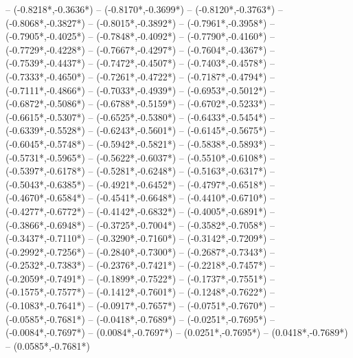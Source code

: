 {	-- ({-0.8218*\dx},{-0.3636*\dy})
	-- ({-0.8170*\dx},{-0.3699*\dy})
	-- ({-0.8120*\dx},{-0.3763*\dy})
	-- ({-0.8068*\dx},{-0.3827*\dy})
	-- ({-0.8015*\dx},{-0.3892*\dy})
	-- ({-0.7961*\dx},{-0.3958*\dy})
	-- ({-0.7905*\dx},{-0.4025*\dy})
	-- ({-0.7848*\dx},{-0.4092*\dy})
	-- ({-0.7790*\dx},{-0.4160*\dy})
	-- ({-0.7729*\dx},{-0.4228*\dy})
	-- ({-0.7667*\dx},{-0.4297*\dy})
	-- ({-0.7604*\dx},{-0.4367*\dy})
	-- ({-0.7539*\dx},{-0.4437*\dy})
	-- ({-0.7472*\dx},{-0.4507*\dy})
	-- ({-0.7403*\dx},{-0.4578*\dy})
	-- ({-0.7333*\dx},{-0.4650*\dy})
	-- ({-0.7261*\dx},{-0.4722*\dy})
	-- ({-0.7187*\dx},{-0.4794*\dy})
	-- ({-0.7111*\dx},{-0.4866*\dy})
	-- ({-0.7033*\dx},{-0.4939*\dy})
	-- ({-0.6953*\dx},{-0.5012*\dy})
	-- ({-0.6872*\dx},{-0.5086*\dy})
	-- ({-0.6788*\dx},{-0.5159*\dy})
	-- ({-0.6702*\dx},{-0.5233*\dy})
	-- ({-0.6615*\dx},{-0.5307*\dy})
	-- ({-0.6525*\dx},{-0.5380*\dy})
	-- ({-0.6433*\dx},{-0.5454*\dy})
	-- ({-0.6339*\dx},{-0.5528*\dy})
	-- ({-0.6243*\dx},{-0.5601*\dy})
	-- ({-0.6145*\dx},{-0.5675*\dy})
	-- ({-0.6045*\dx},{-0.5748*\dy})
	-- ({-0.5942*\dx},{-0.5821*\dy})
	-- ({-0.5838*\dx},{-0.5893*\dy})
	-- ({-0.5731*\dx},{-0.5965*\dy})
	-- ({-0.5622*\dx},{-0.6037*\dy})
	-- ({-0.5510*\dx},{-0.6108*\dy})
	-- ({-0.5397*\dx},{-0.6178*\dy})
	-- ({-0.5281*\dx},{-0.6248*\dy})
	-- ({-0.5163*\dx},{-0.6317*\dy})
	-- ({-0.5043*\dx},{-0.6385*\dy})
	-- ({-0.4921*\dx},{-0.6452*\dy})
	-- ({-0.4797*\dx},{-0.6518*\dy})
	-- ({-0.4670*\dx},{-0.6584*\dy})
	-- ({-0.4541*\dx},{-0.6648*\dy})
	-- ({-0.4410*\dx},{-0.6710*\dy})
	-- ({-0.4277*\dx},{-0.6772*\dy})
	-- ({-0.4142*\dx},{-0.6832*\dy})
	-- ({-0.4005*\dx},{-0.6891*\dy})
	-- ({-0.3866*\dx},{-0.6948*\dy})
	-- ({-0.3725*\dx},{-0.7004*\dy})
	-- ({-0.3582*\dx},{-0.7058*\dy})
	-- ({-0.3437*\dx},{-0.7110*\dy})
	-- ({-0.3290*\dx},{-0.7160*\dy})
	-- ({-0.3142*\dx},{-0.7209*\dy})
	-- ({-0.2992*\dx},{-0.7256*\dy})
	-- ({-0.2840*\dx},{-0.7300*\dy})
	-- ({-0.2687*\dx},{-0.7343*\dy})
	-- ({-0.2532*\dx},{-0.7383*\dy})
	-- ({-0.2376*\dx},{-0.7421*\dy})
	-- ({-0.2218*\dx},{-0.7457*\dy})
	-- ({-0.2059*\dx},{-0.7491*\dy})
	-- ({-0.1899*\dx},{-0.7522*\dy})
	-- ({-0.1737*\dx},{-0.7551*\dy})
	-- ({-0.1575*\dx},{-0.7577*\dy})
	-- ({-0.1412*\dx},{-0.7601*\dy})
	-- ({-0.1248*\dx},{-0.7622*\dy})
	-- ({-0.1083*\dx},{-0.7641*\dy})
	-- ({-0.0917*\dx},{-0.7657*\dy})
	-- ({-0.0751*\dx},{-0.7670*\dy})
	-- ({-0.0585*\dx},{-0.7681*\dy})
	-- ({-0.0418*\dx},{-0.7689*\dy})
	-- ({-0.0251*\dx},{-0.7695*\dy})
	-- ({-0.0084*\dx},{-0.7697*\dy})
	-- ({0.0084*\dx},{-0.7697*\dy})
	-- ({0.0251*\dx},{-0.7695*\dy})
	-- ({0.0418*\dx},{-0.7689*\dy})
	-- ({0.0585*\dx},{-0.7681*\dy})
}
